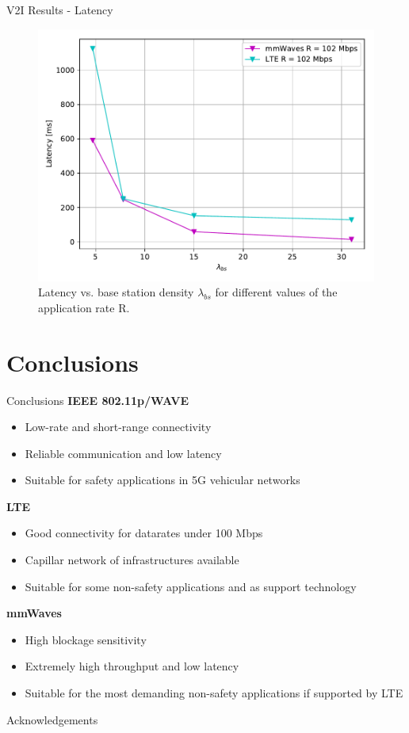 \documentclass{beamer}
\begin{document}
	\begin{frame}{V2I Results - Latency}
		\begin{figure}
			\includegraphics[scale=0.5]{latency_random_lambda_bs_lte_mmwave_UDP}
			\caption{Latency vs. base station density $\lambda_{bs}$ for different values of the application rate R.}
		\end{figure}
	\end{frame}

	\section{Conclusions}
	\begin{frame}{Conclusions}
		\textbf{IEEE 802.11p/WAVE}
		\begin{itemize}
			\item Low-rate and short-range connectivity
			\item Reliable communication and low latency
			\item Suitable for safety applications in 5G vehicular networks
		\end{itemize}
		\textbf{LTE}
		\begin{itemize}
			\item Good connectivity for datarates under 100 Mbps
			\item Capillar network of infrastructures available
			\item Suitable for some non-safety applications and as support technology
		\end{itemize}
		\textbf{mmWaves}
		\begin{itemize}
			\item High blockage sensitivity
			\item Extremely high throughput and low latency
			\item Suitable for the most demanding non-safety applications if supported by LTE
		\end{itemize}
	\end{frame}

	\begin{frame}{Acknowledgements}
	\end{frame}
\end{document}
